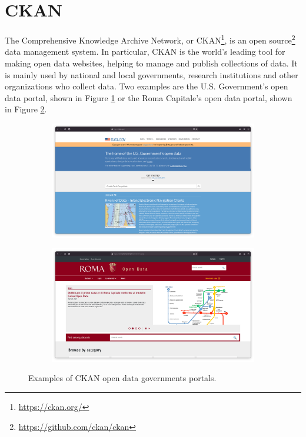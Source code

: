 \section{CKAN}
\label{sec:ckan}

The Comprehensive Knowledge Archive Network, or CKAN\footnote{\url{https://ckan.org/}}, is an open source\footnote{\url{https://github.com/ckan/ckan}} data management system. In particular, CKAN is the world's leading tool for making open data websites, helping to manage and publish collections of data. It is mainly used by national and local governments, research institutions and other organizations who collect data. Two examples are the U.S. Government's open data portal, shown in Figure \ref{fig:ckan-usa} or the Roma Capitale's open data portal, shown in Figure \ref{fig:ckan-roma}.

\begin{figure}
  \begin{subfigure}{.5\columnwidth}
    \centering
    \includegraphics[width=.99\linewidth]{images/ckan/ckan-usa}
    \label{fig:ckan-usa}
  \end{subfigure}%
  \begin{subfigure}{.5\columnwidth}
    \centering
    \includegraphics[width=.99\linewidth]{images/ckan/ckan-roma}
    \label{fig:ckan-roma}
  \end{subfigure}
  \caption{Examples of CKAN open data governments portals.}
  \label{fig:ckan-examples}
\end{figure}

